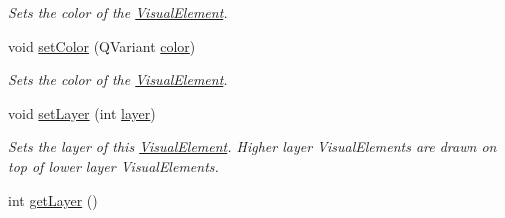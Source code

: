 \begin{DoxyCompactItemize}
\begin{DoxyCompactList}\small\item\em Sets the color of the \hyperlink{struct_picto_1_1_visual_element}{Visual\-Element}. \end{DoxyCompactList}\item 
\hypertarget{struct_picto_1_1_visual_element_a762700b5a1e6a0b9bf834c419845dec6}{void \hyperlink{struct_picto_1_1_visual_element_a762700b5a1e6a0b9bf834c419845dec6}{set\-Color} (Q\-Variant \hyperlink{struct_picto_1_1_visual_element_a45c3042c969717eb2ab60373369c7de7}{color})}\label{struct_picto_1_1_visual_element_a762700b5a1e6a0b9bf834c419845dec6}

\begin{DoxyCompactList}\small\item\em Sets the color of the \hyperlink{struct_picto_1_1_visual_element}{Visual\-Element}. \end{DoxyCompactList}\item 
\hypertarget{struct_picto_1_1_visual_element_afe91b0de6e2bf8d1bdcef241b195a472}{void \hyperlink{struct_picto_1_1_visual_element_afe91b0de6e2bf8d1bdcef241b195a472}{set\-Layer} (int \hyperlink{struct_picto_1_1_visual_element_acad7fb65649363c5bb3a36ac012f4015}{layer})}\label{struct_picto_1_1_visual_element_afe91b0de6e2bf8d1bdcef241b195a472}

\begin{DoxyCompactList}\small\item\em Sets the layer of this \hyperlink{struct_picto_1_1_visual_element}{Visual\-Element}. Higher layer Visual\-Elements are drawn on top of lower layer Visual\-Elements. \end{DoxyCompactList}\item 
\hypertarget{struct_picto_1_1_visual_element_af355b5763dc9c217894d85b63b39de45}{int \hyperlink{struct_picto_1_1_visual_element_af355b5763dc9c217894d85b63b39de45}{get\-Layer} ()}\label{struct_picto_1_1_visual_element_af355b5763dc9c217894d85b63b39de45}


\end{DoxyCompactItemize}
